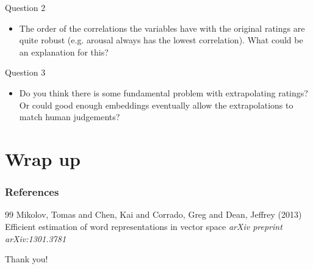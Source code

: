 \documentclass{beamer}
\begin{document}
\begin{frame}{Question 2}
    \begin{itemize}
        \item The order of the correlations the variables have with the original ratings are quite robust (e.g. arousal always has the lowest correlation). What could be an explanation for this?
    \end{itemize}
\end{frame}

\begin{frame}{Question 3}
    \begin{itemize}
        \item Do you think there is some fundamental problem with extrapolating ratings? Or could good enough embeddings eventually allow the extrapolations to match human judgements?
    \end{itemize}
\end{frame}


\section{Wrap up}
\begin{frame}
\frametitle{References}
\footnotesize{
\begin{thebibliography}{99} %
 Mikolov, Tomas and Chen, Kai and Corrado, Greg and Dean, Jeffrey (2013)
\newblock Efficient estimation of word representations in vector space
\newblock \emph{arXiv preprint arXiv:1301.3781}
\end{thebibliography}
}
\end{frame}


\begin{frame}
\Huge{\centerline{Thank you!}}
\end{frame}

\end{document}
